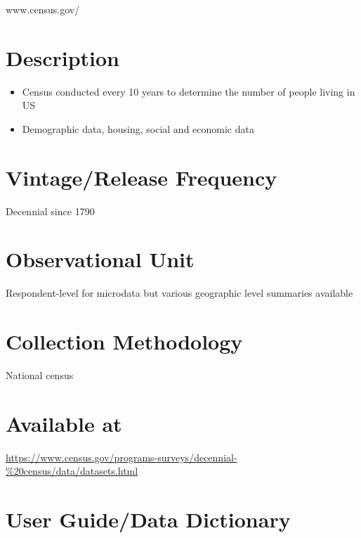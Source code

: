 \documentclass[
]{book}
\providecommand{\tightlist}{%
  \setlength{\itemsep}{0pt}\setlength{\parskip}{0pt}}
\begin{document}
www.census.gov/

\hypertarget{description-94}{%
\section{Description}\label{description-94}}

\begin{itemize}
\tightlist
\item
  Census conducted every 10 years to determine the number of people living in US
\item
  Demographic data, housing, social and economic data
\end{itemize}

\hypertarget{vintagerelease-frequency-94}{%
\section{Vintage/Release Frequency}\label{vintagerelease-frequency-94}}

Decennial since 1790

\hypertarget{observational-unit-94}{%
\section{Observational Unit}\label{observational-unit-94}}

Respondent-level for microdata but various geographic level summaries available

\hypertarget{collection-methodology-94}{%
\section{Collection Methodology}\label{collection-methodology-94}}

National census

\hypertarget{available-at-94}{%
\section{Available at}\label{available-at-94}}

\url{https://www.census.gov/programs-surveys/decennial-\%20census/data/datasets.html}

\hypertarget{user-guidedata-dictionary-94}{%
\section{User Guide/Data Dictionary}\label{user-guidedata-dictionary-94}}
\end{document}

